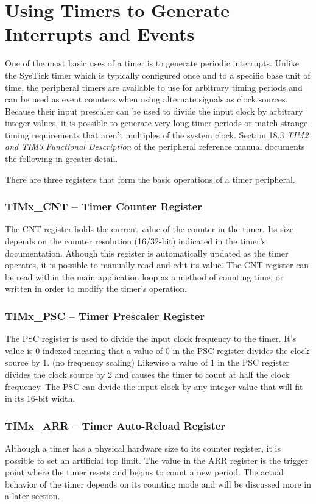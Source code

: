 \documentclass[11pt,fleqn]{book} %
\begin{document}
\section{Using Timers to Generate Interrupts and Events}

    One of the most basic uses of a timer is to generate periodic interrupts. Unlike the SysTick timer which is typically configured once and to a specific base unit of time, the peripheral timers are available to use for arbitrary timing periods and can be used as event counters when using alternate signals as clock sources. Because their input prescaler can be used to divide the input clock by arbitrary integer values, it is possible to generate very long timer periods or match strange timing requirements that aren't multiples of the system clock. Section 18.3 \textit{TIM2 and TIM3 Functional Description} of the peripheral reference manual documents the following in greater detail. 

    There are three registers that form the basic operations of a timer peripheral. 
    \subsubsection{TIMx\_CNT -- Timer Counter Register}
    The CNT register holds the current value of the counter in the timer. Its size depends on the counter resolution (16/32-bit) indicated in the timer's documentation. Athough this register is automatically updated as the timer operates, it is possible to manually read and edit its value. The CNT register can be read within the main application loop as a method of counting time, or written in order to modify the timer's operation. 
    \subsubsection{TIMx\_PSC -- Timer Prescaler Register}
    The PSC register is used to divide the input clock frequency to the timer. It's value is 0-indexed meaning that a value of 0 in the PSC register divides the clock source by 1. (no frequency scaling) Likewise a value of 1 in the PSC register divides the clock source by 2 and causes the timer to count at half the clock frequency. The PSC can divide the input clock by any integer value that will fit in its 16-bit width. 
    \subsubsection{TIMx\_ARR -- Timer Auto-Reload Register}
    Although a timer has a physical hardware size to its counter register, it is possible to set an artificial top limit. The value in the ARR register is the trigger point where the timer resets and begins to count a new period. The actual behavior of the timer depends on its counting mode and will be discussed more in a later section. 
    
\end{document}
